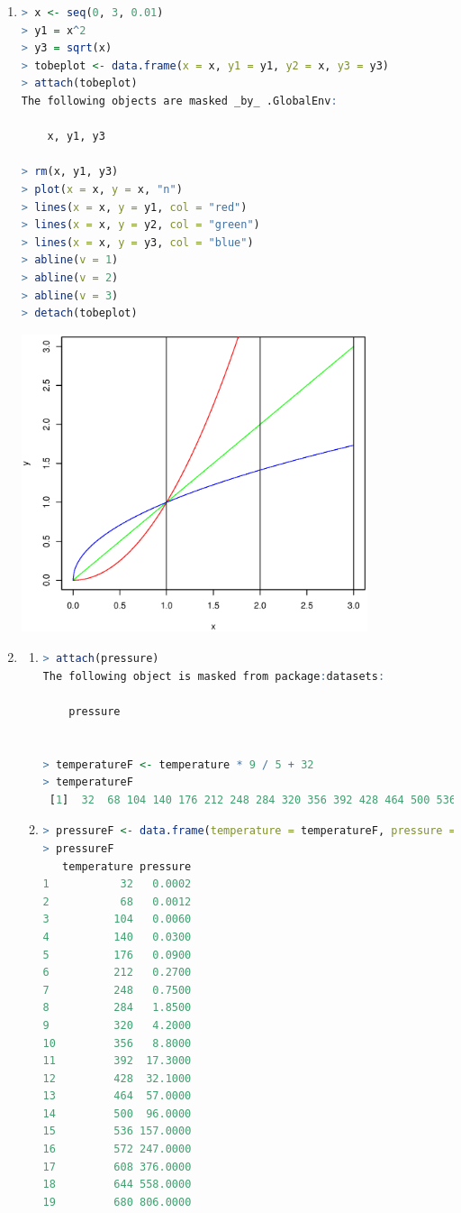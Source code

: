 \documentclass{article}
\begin{document}
\begin{enumerate}[leftmargin = 0 em, label = \arabic*., font = \bfseries]
\newpage
\item 
\begin{lstlisting}[language = R]
> x <- seq(0, 3, 0.01)
> y1 = x^2
> y3 = sqrt(x)
> tobeplot <- data.frame(x = x, y1 = y1, y2 = x, y3 = y3)
> attach(tobeplot)
The following objects are masked _by_ .GlobalEnv:

    x, y1, y3

> rm(x, y1, y3)
> plot(x = x, y = x, "n")
> lines(x = x, y = y1, col = "red")
> lines(x = x, y = y2, col = "green")
> lines(x = x, y = y3, col = "blue")
> abline(v = 1)
> abline(v = 2)
> abline(v = 3)
> detach(tobeplot)
\end{lstlisting}
\begin{center}
\includegraphics[width = 0.8\textwidth]{plot3.eps}
\end{center}

\newpage
\item \begin{enumerate}
	\item 
\begin{lstlisting}[language = R]
> attach(pressure)
The following object is masked from package:datasets:

    pressure


> temperatureF <- temperature * 9 / 5 + 32
> temperatureF
 [1]  32  68 104 140 176 212 248 284 320 356 392 428 464 500 536 572 608 644 680
 \end{lstlisting}

 \item 
 \begin{lstlisting}[language = R]
> pressureF <- data.frame(temperature = temperatureF, pressure = pressure)
> pressureF
   temperature pressure
1           32   0.0002
2           68   0.0012
3          104   0.0060
4          140   0.0300
5          176   0.0900
6          212   0.2700
7          248   0.7500
8          284   1.8500
9          320   4.2000
10         356   8.8000
11         392  17.3000
12         428  32.1000
13         464  57.0000
14         500  96.0000
15         536 157.0000
16         572 247.0000
17         608 376.0000
18         644 558.0000
19         680 806.0000
\end{lstlisting}


\end{enumerate}
\end{enumerate}
\end{document}
